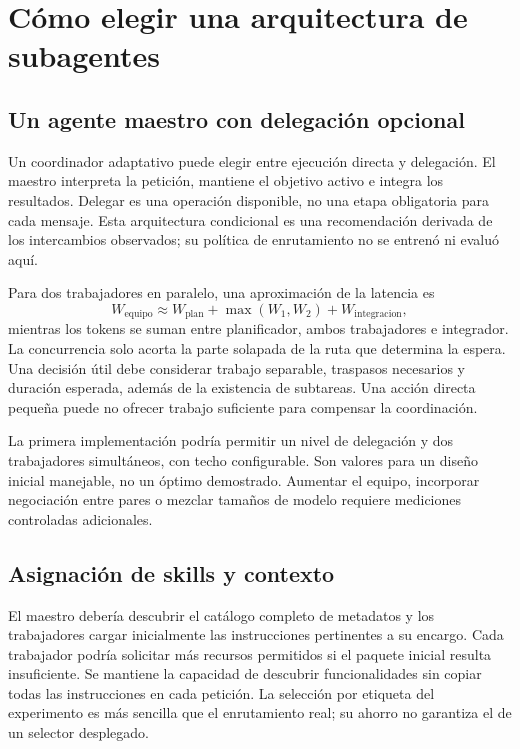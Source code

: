 \section{Cómo elegir una arquitectura de subagentes}


\subsection{Un agente maestro con delegación opcional}
Un coordinador adaptativo puede elegir entre ejecución directa y delegación. El maestro interpreta la petición, mantiene el objetivo activo e integra los resultados. Delegar es una operación disponible, no una etapa obligatoria para cada mensaje. Esta arquitectura condicional es una recomendación derivada de los intercambios observados; su política de enrutamiento no se entrenó ni evaluó aquí.

Para dos trabajadores en paralelo, una aproximación de la latencia es
\begin{equation}
W_{\mathrm{equipo}}\approx W_{\mathrm{plan}}+\max(W_1,W_2)+W_{\mathrm{integracion}},
\end{equation}
mientras los tokens se suman entre planificador, ambos trabajadores e integrador. La concurrencia solo acorta la parte solapada de la ruta que determina la espera. Una decisión útil debe considerar trabajo separable, traspasos necesarios y duración esperada, además de la existencia de subtareas. Una acción directa pequeña puede no ofrecer trabajo suficiente para compensar la coordinación.

La primera implementación podría permitir un nivel de delegación y dos trabajadores simultáneos, con techo configurable. Son valores para un diseño inicial manejable, no un óptimo demostrado. Aumentar el equipo, incorporar negociación entre pares o mezclar tamaños de modelo requiere mediciones controladas adicionales.

\subsection{Asignación de skills y contexto}
El maestro debería descubrir el catálogo completo de metadatos y los trabajadores cargar inicialmente las instrucciones pertinentes a su encargo. Cada trabajador podría solicitar más recursos permitidos si el paquete inicial resulta insuficiente. Se mantiene la capacidad de descubrir funcionalidades sin copiar todas las instrucciones en cada petición. La selección por etiqueta del experimento es más sencilla que el enrutamiento real; su ahorro no garantiza el de un selector desplegado.

